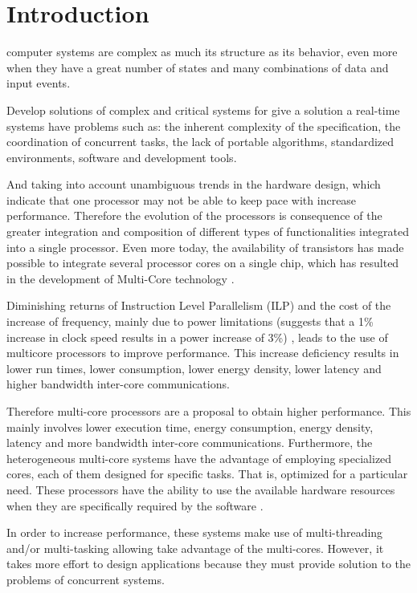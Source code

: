 \section{Introduction}
	 computer systems are complex as much its structure as its behavior, even 
	more when they have a great number of states and many combinations of data and input events.

Develop solutions of complex and critical systems for give a solution a real-time systems have 
 problems such as: the inherent complexity of the specification, the coordination of concurrent 
 tasks, the lack of portable algorithms, standardized environments, software and development tools.

And taking into account unambiguous trends in the hardware design, which indicate that one processor
 may not be able to keep pace with increase performance. Therefore the evolution of the processors 
 is consequence of the greater integration and composition of different types of functionalities 
 integrated into a single processor. Even more today, the availability of transistors has made 
 possible to integrate several processor cores on a single chip, which has resulted in the 
 development of Multi-Core technology \cite{hennessypatterson}.
 
Diminishing returns of Instruction Level Parallelism (ILP) and the cost of the increase of frequency,
 mainly due to power limitations (suggests that a 1\% increase in clock speed results in a power 
 increase of 3\%) \cite{domeika}, leads to the use of multicore processors to improve performance. 
 This increase deficiency results in lower run times, lower consumption, lower energy density, lower
 latency and higher bandwidth inter-core communications.
    
Therefore multi-core processors are a proposal to obtain higher performance. This mainly involves 
 lower execution time, energy consumption, energy density, latency and more bandwidth inter-core 
 communications. Furthermore, the heterogeneous multi-core systems have the advantage of employing 
 specialized cores, each of them designed for specific tasks. That is, optimized for a particular 
 need. These processors have the ability to use the available hardware resources when they are 
 specifically required by the software \cite{sriram}.

In order to increase performance, these systems make use of multi-threading and/or multi-tasking 
 allowing take advantage of the multi-cores. However, it takes more effort to design applications 
 because they must provide solution to the problems of concurrent systems.

